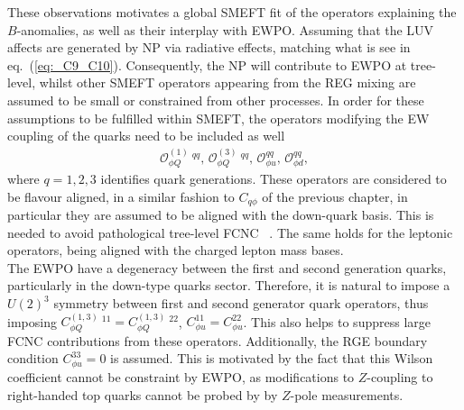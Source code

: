 These observations motivates a global SMEFT fit  of the operators explaining the  $B$-anomalies, as well as their interplay with EWPO.  Assuming that the LUV affects are generated by NP via radiative effects, matching what is see in  eq.~(\ref{eq:_C9_C10}). Consequently, the NP will contribute to EWPO at tree-level, whilst other SMEFT operators appearing from the REG mixing are assumed to be small or constrained from other processes.  In order for these assumptions to be fulfilled within SMEFT, the operators modifying the EW coupling of the quarks need to be included as well 
\begin{eqnarray} 
	\label{eq:SMEFT_op_HQ}
		\mathcal{O}_{\phi Q}^{(1)} \ ^{qq} , \,
		\mathcal{O}_{\phi Q}^{(3)}\ ^{qq} ,\,  
		\mathcal{O}_{\phi u}^{qq}, \, 
		\mathcal{O}_{\phi d}^{qq}, 
\end{eqnarray}
where $q=1,2,3$ identifies quark generations. These operators are considered to be flavour aligned, in a similar fashion to $C_{q\phi}$ of the previous chapter, in particular they are assumed to be aligned with the down-quark basis. This is needed to avoid pathological tree-level FCNC ~\cite{Silvestrini:2018dos}. The same holds for the leptonic operators, being aligned with the charged lepton mass bases.\\
%
The EWPO have a degeneracy between the first and second generation quarks, particularly in the down-type quarks sector. Therefore, it is natural to impose a $U(2)^3$ symmetry between first and second generator quark operators, thus imposing $C_{\phi Q}^{(1,3)}\ ^{11} = C_{\phi Q}^{(1,3)}\ ^{22} $, $C_{\phi u}^{11} = C_{\phi u}^{22}$. This also helps to suppress large FCNC contributions from these operators.  Additionally, the RGE boundary condition $C^{33}_{\phi u}=0$ is assumed. This is motivated by the fact that this Wilson coefficient cannot be constraint by EWPO, as modifications to $Z$-coupling to right-handed top quarks cannot be probed by by $Z$-pole measurements. 
%
